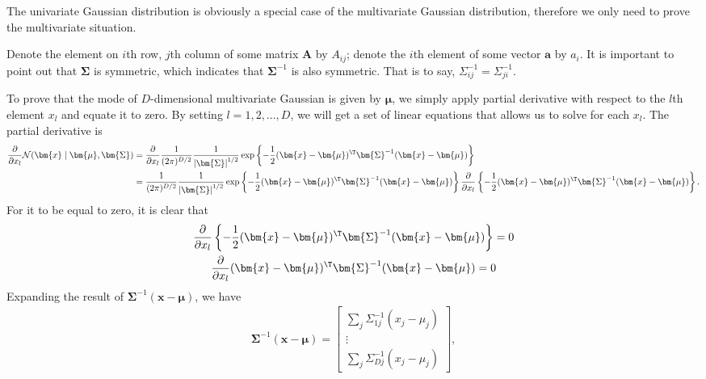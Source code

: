 \begin{answer}{}
	The univariate Gaussian distribution is obviously a special case of the multivariate Gaussian distribution, therefore we only need to prove the multivariate situation. 
	
	Denote the element on $i$th row, $j$th column of some matrix $\bm{A}$ by $A_{ij}$; denote the $i$th element of some vector $\bm{a}$ by $a_i$. It is important to point out that $\bm{\Sigma}$ is symmetric, which indicates that $\bm{\Sigma}^{-1}$ is also symmetric. That is to say, $\Sigma^{-1}_{ij} = \Sigma^{-1}_{ji}$. 
	
	To prove that the mode of $D$-dimensional multivariate Gaussian is given by $\bm{\mu}$, we simply apply partial derivative with respect to the $l$th element $x_l$ and equate it to zero. By setting $l = 1, 2,\ldots,D$, we will get a set of linear equations that allows us to solve for each $x_l$. The partial derivative is
	\begin{align}
		\frac{\partial}{\partial x_l} \mathcal{N}(\bm{x} \mid \bm{\mu}, \bm{\Sigma}) &= \frac{\partial}{\partial x_l}\frac{1}{(2\pi)^{D/2}} \frac{1}{\left\lvert \bm{\Sigma} \right\rvert^{1/2}} \exp\left\{ -\frac{1}{2}(\bm{x}-\bm{\mu})^{\T}\bm{\Sigma}^{-1}(\bm{x}-\bm{\mu}) \right\}\\
		&= \frac{1}{(2\pi)^{D/2}} \frac{1}{\left\lvert \bm{\Sigma} \right\rvert^{1/2}}\exp\left\{ -\frac{1}{2}(\bm{x}-\bm{\mu})^{\T}\bm{\Sigma}^{-1}(\bm{x}-\bm{\mu})\right\} \frac{\partial}{\partial x_l} \left\{ -\frac{1}{2}(\bm{x}-\bm{\mu})^{\T}\bm{\Sigma}^{-1}(\bm{x}-\bm{\mu})\right\}.
	\end{align}
	For it to be equal to zero, it is clear that
	\begin{gather}
		\frac{\partial}{\partial x_l} \left\{ -\frac{1}{2}(\bm{x}-\bm{\mu})^{\T}\bm{\Sigma}^{-1}(\bm{x}-\bm{\mu})\right\} = 0\\
		\frac{\partial}{\partial x_l} (\bm{x}-\bm{\mu})^{\T}\bm{\Sigma}^{-1}(\bm{x}-\bm{\mu}) = 0
	\end{gather}
	Expanding the result of $\bm{\Sigma}^{-1}(\bm{x}-\bm{\mu})$, we have
	\begin{align}
		\bm{\Sigma}^{-1}(\bm{x}-\bm{\mu}) = 
		\begin{bmatrix}
		\sum_j \Sigma_{1j}^{-1} \left(x_j - \mu_j\right)\\
		\vdots\\
		\sum_j \Sigma_{Dj}^{-1} \left(x_j - \mu_j\right)
		\end{bmatrix},
	\end{align}

\end{answer}
